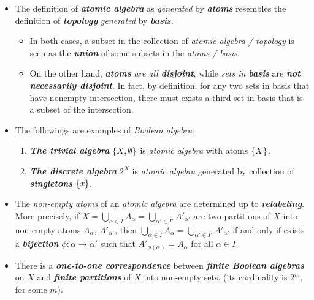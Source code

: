 \documentclass[11pt]{article}
\begin{document}
\begin{itemize}
\item \begin{remark}
The definition of \emph{\textbf{atomic algebra}} as \emph{generated} by \emph{\textbf{atoms}} resembles the definition of \emph{\textbf{topology}} \emph{generated} by \emph{\textbf{basis}}. 
\begin{itemize}
\item In both cases, a subset in the collection of \emph{atomic algebra / topology}  is seen as the \emph{\textbf{union}} of some subsets in the \emph{atoms / basis}. 
\item On the other hand, \emph{\textbf{atoms} are all \textbf{disjoint}}, while \emph{sets in \textbf{basis}} are \emph{\textbf{not necessarily disjoint}}. In fact, by definition, for any two sets in basis that have nonempty intersection, there must exists a third set in basis that is a subset of the intersection.
\end{itemize}
\end{remark}

\item \begin{example}
The followings are examples of \emph{Boolean algebra}:
\begin{enumerate}
\item \emph{\textbf{The trivial algebra}} $\left\{X, \emptyset\right\}$ is \emph{atomic algebra} with atoms $\left\{X\right\}$.
\item \emph{\textbf{The discrete algebra}} $2^{X}$ is \emph{atomic algebra} generated by collection of \emph{\textbf{singletons}} $\left\{x\right\}$.
\end{enumerate}
\end{example}

\item \begin{remark}
The \emph{non-empty atoms} of an \emph{atomic algebra} are determined up to \emph{\textbf{relabeling}}. More precisely, if $X= \bigcup_{\alpha\in I}A_{\alpha} = \bigcup_{\alpha'\in I'}A'_{\alpha'} $ are two partitions of $X$ into non-empty
atoms $A_{\alpha}$, $A'_{\alpha'}$, then $\bigcup_{\alpha\in I}A_{\alpha} = \bigcup_{\alpha'\in I'}A'_{\alpha'} $ if and only if exists a \emph{\textbf{bijection}} $\phi : \alpha \rightarrow \alpha'$ such that $A'_{\phi(\alpha)} = A_{\alpha}$ for all $\alpha \in I$.  \citep{tao2011introduction}
\end{remark}



\item \begin{remark}
There is a \emph{\textbf{one-to-one correspondence}} between \emph{\textbf{finite Boolean algebras}} on $X$ and \emph{\textbf{finite partitions}} of $X$ into non-empty sets. (its cardinality is $2^{m}$, for some $m$).  \citep{tao2011introduction}
\end{remark}


\end{itemize}
\end{document}
